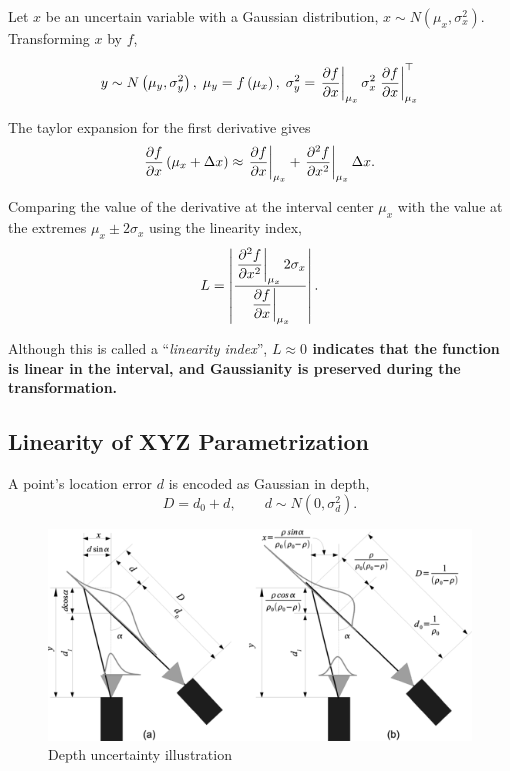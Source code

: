\documentclass[twoside]{article}
\begin{document}
Let $x$ be an uncertain variable with a Gaussian distribution, $x \sim N (\mu_x, \sigma_x^2)$. Transforming $x$ by $f$,

\begin{equation}
y\sim N\left(\mu_y,\sigma_y^2\right), \; \mu_y=f\left(\mu_x\right),\;\sigma_y^2=\left.{\partial f\over \partial x}\right\vert _{\mu_x} \sigma_x^2 \left.{\partial f\over \partial x}\right\vert _{\mu_x}^\top 
\end{equation}

The taylor expansion for the first derivative gives
\begin{equation}
{\partial f \over \partial x}\left(\mu_x+\Delta x\right)\approx \left.{\partial f \over \partial x}\right\vert _{\mu_x}+ \left.{\partial^2 f \over \partial x^2}\right\vert _{\mu_x}\Delta x .
\end{equation}

Comparing the value of the derivative at the interval center $\mu_x$ with the value at the extremes $\mu_x \pm 2\sigma_x$ using the linearity index,
\begin{equation}
L=\left\vert {\left.\displaystyle{\partial^2 f\over \partial x^2}\right\vert _{\mu_x}2\sigma_x\over \left.\displaystyle{\partial f\over \partial x}\right\vert _{\mu_x}}\right\vert .
\end{equation}

Although this is called a ``\textit{linearity index}'', \textbf{$L \approx 0$ indicates that the function is linear in the interval, and Gaussianity is preserved during the transformation.}

\subsection*{Linearity of XYZ Parametrization}

A point's location error $d$ is encoded as Gaussian in depth,
\begin{equation}
D = d_0+d, \qquad d \sim N\left(0,\sigma_d^2\right).
\end{equation}
\begin{figure}[h]
\includegraphics[scale=0.5]{uncertainty.png}
\centering
\caption{Depth uncertainty illustration}
\end{figure}
\end{document}
